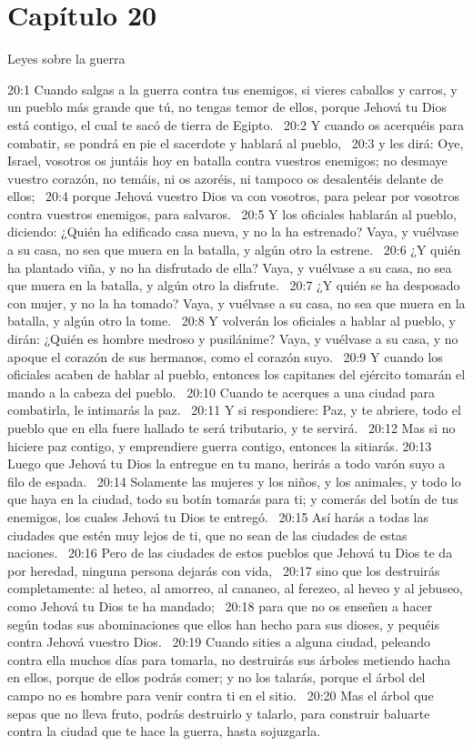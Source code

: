 \section*{Capítulo 20 }
Leyes sobre la guerra  

20:1 Cuando salgas a la guerra contra tus enemigos, si vieres caballos y carros, y un pueblo más grande que tú, no tengas temor de ellos, porque Jehová tu Dios está contigo, el cual te sacó de tierra de Egipto.  
20:2 Y cuando os acerquéis para combatir, se pondrá en pie el sacerdote y hablará al pueblo,  
20:3 y les dirá: Oye, Israel, vosotros os juntáis hoy en batalla contra vuestros enemigos; no desmaye vuestro corazón, no temáis, ni os azoréis, ni tampoco os desalentéis delante de ellos;  
20:4 porque Jehová vuestro Dios va con vosotros, para pelear por vosotros contra vuestros enemigos, para salvaros.  
20:5 Y los oficiales hablarán al pueblo, diciendo: ¿Quién ha edificado casa nueva, y no la ha estrenado? Vaya, y vuélvase a su casa, no sea que muera en la batalla, y algún otro la estrene.  
20:6 ¿Y quién ha plantado viña, y no ha disfrutado de ella? Vaya, y vuélvase a su casa, no sea que muera en la batalla, y algún otro la disfrute.  
20:7 ¿Y quién se ha desposado con mujer, y no la ha tomado? Vaya, y vuélvase a su casa, no sea que muera en la batalla, y algún otro la tome.  
20:8 Y volverán los oficiales a hablar al pueblo, y dirán: ¿Quién es hombre medroso y pusilánime? Vaya, y vuélvase a su casa, y no apoque el corazón de sus hermanos, como el corazón suyo.  
20:9 Y cuando los oficiales acaben de hablar al pueblo, entonces los capitanes del ejército tomarán el mando a la cabeza del pueblo.  
20:10 Cuando te acerques a una ciudad para combatirla, le intimarás la paz.  
20:11 Y si respondiere: Paz, y te abriere, todo el pueblo que en ella fuere hallado te será tributario, y te servirá.  
20:12 Mas si no hiciere paz contigo, y emprendiere guerra contigo, entonces la sitiarás. 
20:13 Luego que Jehová tu Dios la entregue en tu mano, herirás a todo varón suyo a filo de espada.  
20:14 Solamente las mujeres y los niños, y los animales, y todo lo que haya en la ciudad, todo su botín tomarás para ti; y comerás del botín de tus enemigos, los cuales Jehová tu Dios te entregó.  
20:15 Así harás a todas las ciudades que estén muy lejos de ti, que no sean de las ciudades de estas naciones.  
20:16 Pero de las ciudades de estos pueblos que Jehová tu Dios te da por heredad, ninguna persona dejarás con vida,  
20:17 sino que los destruirás completamente: al heteo, al amorreo, al cananeo, al ferezeo, al heveo y al jebuseo, como Jehová tu Dios te ha mandado;  
20:18 para que no os enseñen a hacer según todas sus abominaciones que ellos han hecho para sus dioses, y pequéis contra Jehová vuestro Dios.  
20:19 Cuando sities a alguna ciudad, peleando contra ella muchos días para tomarla, no destruirás sus árboles metiendo hacha en ellos, porque de ellos podrás comer; y no los talarás, porque el árbol del campo no es hombre para venir contra ti en el sitio.  
20:20 Mas el árbol que sepas que no lleva fruto, podrás destruirlo y talarlo, para construir baluarte contra la ciudad que te hace la guerra, hasta sojuzgarla.  
